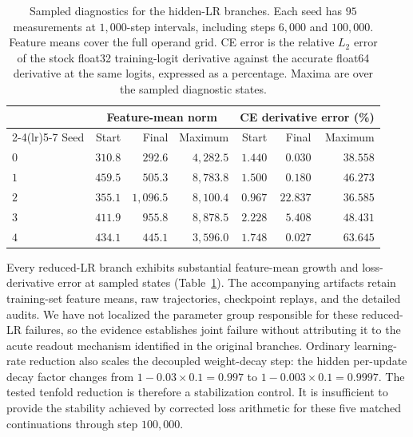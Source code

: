 \clearpage
\begin{table}[!htbp]
\centering\small
\caption{Sampled diagnostics for the hidden-LR branches. Each seed has $95$ measurements at $1{,}000$-step intervals, including steps $6{,}000$ and $100{,}000$. Feature means cover the full operand grid. CE error is the relative $L_2$ error of the stock float32 training-logit derivative against the accurate float64 derivative at the same logits, expressed as a percentage. Maxima are over the sampled diagnostic states.}
\label{tab:lr-reduction-diagnostics}
\begin{tabular}{lrrrrrr}
\toprule
& \multicolumn{3}{c}{Feature-mean norm} & \multicolumn{3}{c}{CE derivative error (\%)} \\
\cmidrule(lr){2-4}\cmidrule(lr){5-7}
Seed & Start & Final & Maximum & Start & Final & Maximum \\
\midrule
$0$ & $310.8$ & $292.6$ & $4{,}282.5$ & $1.440$ & $0.030$ & $38.558$ \\
$1$ & $459.5$ & $505.3$ & $8{,}783.8$ & $1.500$ & $0.180$ & $46.273$ \\
$2$ & $355.1$ & $1{,}096.5$ & $8{,}100.4$ & $0.967$ & $22.837$ & $36.585$ \\
$3$ & $411.9$ & $955.8$ & $8{,}878.5$ & $2.228$ & $5.408$ & $48.431$ \\
$4$ & $434.1$ & $445.1$ & $3{,}596.0$ & $1.748$ & $0.027$ & $63.645$ \\
\bottomrule
\end{tabular}
\end{table}

Every reduced-LR branch exhibits substantial feature-mean growth and loss-derivative error at sampled states (Table~\ref{tab:lr-reduction-diagnostics}). The accompanying artifacts retain training-set feature means, raw trajectories, checkpoint replays, and the detailed audits. We have not localized the parameter group responsible for these reduced-LR failures, so the evidence establishes joint failure without attributing it to the acute readout mechanism identified in the original branches. Ordinary learning-rate reduction also scales the decoupled weight-decay step: the hidden per-update decay factor changes from $1-0.03\times0.1=0.997$ to $1-0.003\times0.1=0.9997$. The tested tenfold reduction is therefore a stabilization control. It is insufficient to provide the stability achieved by corrected loss arithmetic for these five matched continuations through step $100{,}000$.




